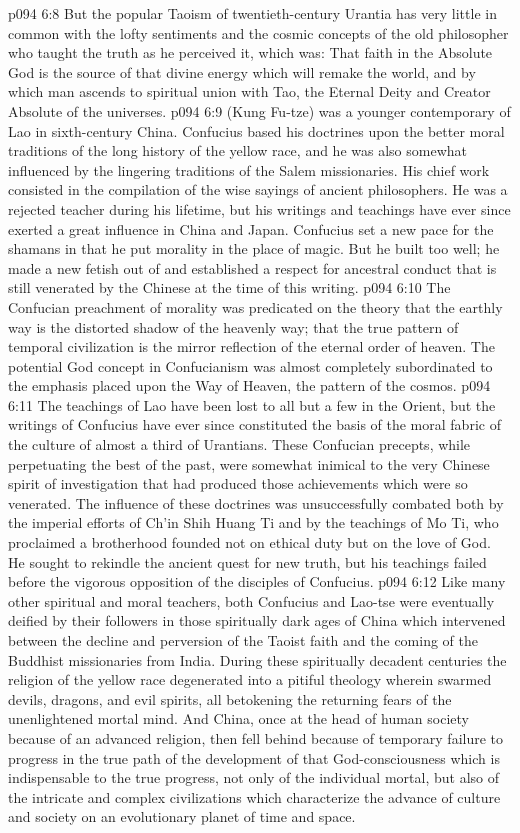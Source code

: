 \vs p094 6:8 But the popular Taoism of twentieth\hyp{}century Urantia has very little in common with the lofty sentiments and the cosmic concepts of the old philosopher who taught the truth as he perceived it, which was: That faith in the Absolute God is the source of that divine energy which will remake the world, and by which man ascends to spiritual union with Tao, the Eternal Deity and Creator Absolute of the universes.
\pc \vs p094 6:9  (Kung Fu\hyp{}tze) was a younger contemporary of Lao in sixth\hyp{}century China. Confucius based his doctrines upon the better moral traditions of the long history of the yellow race, and he was also somewhat influenced by the lingering traditions of the Salem missionaries. His chief work consisted in the compilation of the wise sayings of ancient philosophers. He was a rejected teacher during his lifetime, but his writings and teachings have ever since exerted a great influence in China and Japan. Confucius set a new pace for the shamans in that he put morality in the place of magic. But he built too well; he made a new fetish out of  and established a respect for ancestral conduct that is still venerated by the Chinese at the time of this writing.
\vs p094 6:10 The Confucian preachment of morality was predicated on the theory that the earthly way is the distorted shadow of the heavenly way; that the true pattern of temporal civilization is the mirror reflection of the eternal order of heaven. The potential God concept in Confucianism was almost completely subordinated to the emphasis placed upon the Way of Heaven, the pattern of the cosmos.
\vs p094 6:11 The teachings of Lao have been lost to all but a few in the Orient, but the writings of Confucius have ever since constituted the basis of the moral fabric of the culture of almost a third of Urantians. These Confucian precepts, while perpetuating the best of the past, were somewhat inimical to the very Chinese spirit of investigation that had produced those achievements which were so venerated. The influence of these doctrines was unsuccessfully combated both by the imperial efforts of Ch’in Shih Huang Ti and by the teachings of Mo Ti, who proclaimed a brotherhood founded not on ethical duty but on the love of God. He sought to rekindle the ancient quest for new truth, but his teachings failed before the vigorous opposition of the disciples of Confucius.
\vs p094 6:12 Like many other spiritual and moral teachers, both Confucius and Lao\hyp{}tse were eventually deified by their followers in those spiritually dark ages of China which intervened between the decline and perversion of the Taoist faith and the coming of the Buddhist missionaries from India. During these spiritually decadent centuries the religion of the yellow race degenerated into a pitiful theology wherein swarmed devils, dragons, and evil spirits, all betokening the returning fears of the unenlightened mortal mind. And China, once at the head of human society because of an advanced religion, then fell behind because of temporary failure to progress in the true path of the development of that God\hyp{}consciousness which is indispensable to the true progress, not only of the individual mortal, but also of the intricate and complex civilizations which characterize the advance of culture and society on an evolutionary planet of time and space.\plusone
